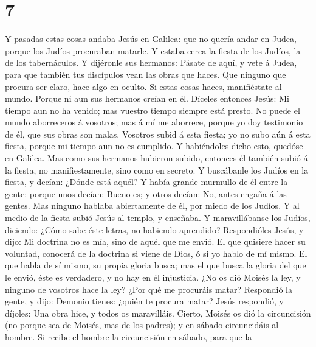 \hypertarget{section-6}{%
\section{7}\label{section-6}}

 Y pasadas estas cosas andaba Jesús en Galilea: que no
quería andar en Judea, porque los Judíos procuraban matarle.
 Y estaba cerca la fiesta de los Judíos, la de los
tabernáculos.  Y dijéronle sus hermanos: Pásate de aquí, y
vete á Judea, para que también tus discípulos vean las obras que haces.
 Que ninguno que procura ser claro, hace algo en oculto. Si
estas cosas haces, manifiéstate al mundo.  Porque ni aun sus
hermanos creían en él.  Díceles entonces Jesús: Mi tiempo
aun no ha venido; mas vuestro tiempo siempre está presto. 
No puede el mundo aborreceros á vosotros; mas á mí me aborrece, porque
yo doy testimonio de él, que sus obras son malas.  Vosotros
subid á esta fiesta; yo no subo aún á esta fiesta, porque mi tiempo aun
no es cumplido.  Y habiéndoles dicho esto, quedóse en
Galilea.  Mas como sus hermanos hubieron subido, entonces
él también subió á la fiesta, no manifiestamente, sino como en secreto.
 Y buscábanle los Judíos en la fiesta, y decían: ¿Dónde
está aquél?  Y había grande murmullo de él entre la gente:
porque unos decían: Bueno es; y otros decían: No, antes engaña á las
gentes.  Mas ninguno hablaba abiertamente de él, por miedo
de los Judíos.  Y al medio de la fiesta subió Jesús al
templo, y enseñaba.  Y maravillábanse los Judíos, diciendo:
¿Cómo sabe éste letras, no habiendo aprendido? 
Respondióles Jesús, y dijo: Mi doctrina no es mía, sino de aquél que me
envió.  El que quisiere hacer su voluntad, conocerá de la
doctrina si viene de Dios, ó si yo hablo de mí mismo.  El
que habla de sí mismo, su propia gloria busca; mas el que busca la
gloria del que le envió, éste es verdadero, y no hay en él injusticia.
 ¿No os dió Moisés la ley, y ninguno de vosotros hace la
ley? ¿Por qué me procuráis matar?  Respondió la gente, y
dijo: Demonio tienes: ¿quién te procura matar?  Jesús
respondió, y díjoles: Una obra hice, y todos os maravilláis.
 Cierto, Moisés os dió la circuncisión (no porque sea de
Moisés, mas de los padres); y en sábado circuncidáis al hombre.
 Si recibe el hombre la circuncisión en sábado, para que la
